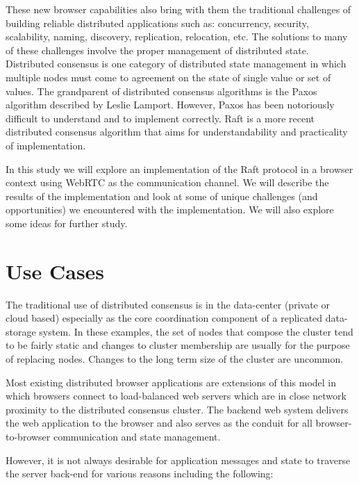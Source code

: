 \documentclass{acmtog} %
\begin{document}
These new browser capabilities also bring with them the traditional
challenges of building reliable distributed applications such as:
concurrency, security, scalability, naming, discovery, replication,
relocation, etc. The solutions to many of these challenges involve
the proper management of distributed state. Distributed consensus is
one category of distributed state management in which multiple nodes
must come to agreement on the state of single value or set of values.
The grandparent of distributed consensus algorithms is the Paxos
algorithm described by Leslie Lamport. However, Paxos has been
notoriously difficult to understand and to implement correctly. Raft
is a more recent distributed consensus algorithm that aims for
understandability and practicality of implementation.

In this study we will explore an implementation of the Raft protocol
in a browser context using WebRTC as the communication channel. We
will describe the results of the implementation and look at some of
unique challenges (and opportunities) we encountered with the
implementation. We will also explore some ideas for further study.

\section{Use Cases}
The traditional use of distributed consensus is in the data-center
(private or cloud based) especially as the core coordination component
of a replicated data-storage system. In these examples, the set of
nodes that compose the cluster tend to be fairly static and changes to
cluster membership are usually for the purpose of replacing nodes.
Changes to the long term size of the cluster are uncommon.

Most existing distributed browser applications are extensions of this
model in which browsers connect to load-balanced web servers which are
in close network proximity to the distributed consensus cluster. The
backend web system delivers the web application to the browser and
also serves as the conduit for all browser-to-browser communication
and state management.

However, it is not always desirable for application messages and state
to traverse the server back-end for various reasons including the
following:
\end{document}
